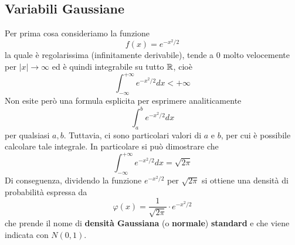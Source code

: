 \subsection{Variabili Gaussiane}
Per prima cosa consideriamo la funzione
\[ f(x) = e^{-x^2 / 2} \]
la quale è regolarissima (infinitamente derivabile), tende a 0 molto velocemente per
$|x| \to \infty$ ed è quindi integrabile su tutto $\mathbb{R}$, cioè
\[ \int_{-\infty}^{+\infty} e^{-x^2/2} dx < +\infty \]
Non esite però una formula esplicita per esprimere analiticamente
\[ \int_a^b e^{-x^2 / 2} dx \]
per qualsiasi $a,b$. Tuttavia, ci sono particolari valori di $a$ e $b$, per cui è possibile
calcolare tale integrale. In particolare si può dimostrare che
\[ \int_{-\infty}^{+\infty} e^{-x^2 / 2} dx = \sqrt{2 \pi} \]
Di conseguenza, dividendo la funzione $e^{-x^2/2}$ per $\sqrt{2 \pi}$ si ottiene una densità di
probabilità espressa da
\[ \varphi (x) = \frac{1}{\sqrt{2 \pi}} \cdot e^{-x^2 / 2} \]
che prende il nome di \textbf{densità Gaussiana} (o \textbf{normale}) \textbf{standard} e che viene
indicata con $N(0,1)$.

